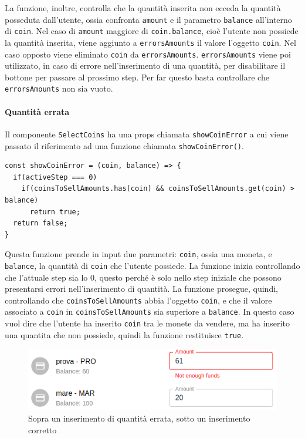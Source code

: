 \documentclass[a4paper]{article}
\begin{document}
        \newline
        La funzione, inoltre, controlla che la quantità inserita non ecceda la quantità posseduta dall'utente, ossia confronta \verb|amount| e il parametro \verb|balance| all'interno di \verb|coin|.
        \newline
        Nel caso di \verb|amount| maggiore di \verb|coin.balance|, cioè l'utente non possiede la quantità inserita, viene aggiunto a \verb|errorsAmounts| il valore l'oggetto \verb|coin|.
        Nel caso opposto viene eliminato \verb|coin| da \verb|errorsAmounts|. \verb|errorsAmounts| viene poi utilizzato, in caso di errore nell'inserimento di una quantità, per disabilitare il bottone per passare al prossimo step.
        Per far questo basta controllare che \verb|errorsAmounts| non sia vuoto.
        \paragraph{Quantità errata}
        \label{quantityerror}
        Il componente \verb|SelectCoins| ha una props chiamata \verb|showCoinError| a cui viene passato il riferimento ad una funzione chiamata \verb|showCoinError()|.
        \begin{lstlisting}[style=ES6, title={Funzione showCoinError}]
const showCoinError = (coin, balance) => {
  if(activeStep === 0) 
    if(coinsToSellAmounts.has(coin) && coinsToSellAmounts.get(coin) > balance)
      return true;
  return false;
}\end{lstlisting}
        Questa funzione prende in input due parametri: \verb|coin|, ossia una moneta, e \verb|balance|, la quantità di \verb|coin| che l'utente possiede. La funzione inizia controllando che l'attuale step sia lo 0,
        questo perché è solo nello step iniziale che possono presentarsi errori nell'inserimento di quantità. La funzione prosegue, quindi, controllando che \verb|coinsToSellAmounts| abbia l'oggetto \verb|coin|, e che il valore associato a \verb|coin| in \verb|coinsToSellAmounts| sia superiore a \verb|balance|.
        In questo caso vuol dire che l'utente ha inserito \verb|coin| tra le monete da vendere, ma ha inserito una quantita che non possiede, quindi la funzione restituisce \verb|true|.
        \begin{figure}[H]
          \includegraphics[scale=0.5, fbox]{errorMessage.png}
          \centering
          \caption{Sopra un inserimento di quantità errata, sotto un inserimento corretto}
          \centering
          \label{fig:errorMessage}
        \end{figure}
\end{document}
